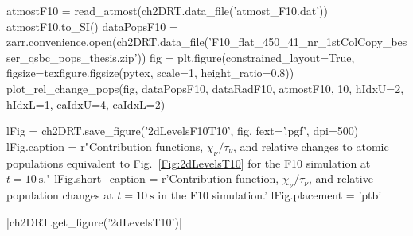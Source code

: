 \begin{pycode}[2DRT]
atmostF10 = read_atmost(ch2DRT.data_file('atmost_F10.dat'))
atmostF10.to_SI()
dataPopsF10 = zarr.convenience.open(ch2DRT.data_file('F10_flat_450_41_nr_1stColCopy_besser_qsbc_pops_thesis.zip'))
fig = plt.figure(constrained_layout=True, figsize=texfigure.figsize(pytex, scale=1, height_ratio=0.8))
plot_rel_change_pops(fig, dataPopsF10, dataRadF10, atmostF10, 10, hIdxU=2, hIdxL=1, caIdxU=4, caIdxL=2)

lFig = ch2DRT.save_figure('2dLevelsF10T10', fig, fext='.pgf', dpi=500)
lFig.caption = r"Contribution functions, $\chi_\nu/\tau_\nu$, and relative changes to atomic populations equivalent to Fig.~\ref{Fig:2dLevelsT10} for the F10 simulation at $t=\SI{10}{\second}$."
lFig.short_caption = r'Contribution function, $\chi_\nu/\tau_\nu$, and relative population changes at $t=\SI{10}{\second}$ in the F10 simulation.'
lFig.placement =  'ptb'

\end{pycode}

\py[2DRT]|ch2DRT.get_figure('2dLevelsT10')|


